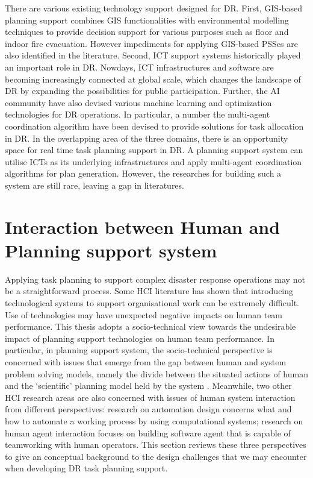 There are various existing technology support designed for \ac{DR}. First, \ac{GIS}-based planning support combines \ac{GIS} functionalities with environmental modelling techniques to provide decision support for various purposes such as floor and indoor fire evacuation. However impediments for applying \ac{GIS}-based \ac{PSS}es are also identified in the literature. Second, \ac{ICT} support systems historically played an important role in \ac{DR}. Nowdays, \ac{ICT} infrastructures and software are becoming increasingly connected at global scale, which changes the landscape of \ac{DR} by expanding the possibilities for public participation. Further, the \ac{AI} community have also devised various machine learning and optimization technologies for \ac{DR} operations. In particular, a number the multi-agent coordination algorithm have been devised to provide solutions for task allocation in \ac{DR}. In the overlapping area of the three domains, there is an opportunity space for real time task planning support in \ac{DR}. A planning support system can utilise \ac{ICT}s as its underlying infrastructures and apply multi-agent coordination algorithms for plan generation. However, the researches for building such a system are still rare, leaving a gap in literatures.\\

\chapter{Interaction between Human and Planning support system}\label{ch:humanSysRelationship}

Applying task planning to support complex disaster response operations may not be a straightforward process. Some \ac{HCI} literature \citep{Ackerman2000,Bowers1994,Niazkhani2009} has shown that introducing technological systems to support organisational work can be extremely difficult. Use of technologies may have unexpected negative impacts on human team performance. This thesis adopts a socio-technical view towards the undesirable impact of planning support technologies on human team performance. In particular, in planning support system, the socio-technical perspective is concerned with issues that emerge from the gap between human and system problem solving models, namely the divide between the situated actions of human and the `scientific' planning model held by the system \citep{Suchman1987}. Meanwhile, two other \ac{HCI} research areas are also concerned with issues of human system interaction from different perspectives: research on automation design concerns what and how to automate a working process by using computational systems; research on human agent interaction focuses on building software agent that is capable of teamworking with human operators. This section reviews these three perspectives to give an conceptual background to the design challenges that we may encounter when developing \ac{DR} task planning support.\\

